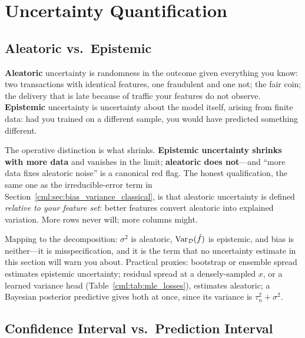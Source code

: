 \section{Uncertainty Quantification}
\label{cml:sec:uncertainty}

\subsection{Aleatoric vs.\ Epistemic}

\textbf{Aleatoric} uncertainty is randomness in the outcome given everything you know: two transactions with identical features, one fraudulent and one not; the fair coin; the delivery that is late because of traffic your features do not observe. \textbf{Epistemic} uncertainty is uncertainty about the model itself, arising from finite data: had you trained on a different sample, you would have predicted something different.

The operative distinction is what shrinks. \textbf{Epistemic uncertainty shrinks with more data} and vanishes in the limit; \textbf{aleatoric does not}---and ``more data fixes aleatoric noise'' is a canonical red flag. The honest qualification, the same one as the irreducible-error term in Section~\ref{cml:sec:bias_variance_classical}, is that aleatoric uncertainty is defined \textit{relative to your feature set}: better features convert aleatoric into explained variation. More rows never will; more columns might.

Mapping to the decomposition: $\sigma^2$ is aleatoric, $\operatorname{Var}_\mathcal{D}(\hat f)$ is epistemic, and bias is neither---it is misspecification, and it is the term that no uncertainty estimate in this section will warn you about. Practical proxies: bootstrap or ensemble spread estimates epistemic uncertainty; residual spread at a densely-sampled $x$, or a learned variance head (Table~\ref{cml:tab:mle_losses}), estimates aleatoric; a Bayesian posterior predictive gives both at once, since its variance is $\tau_n^2 + \sigma^2$.

\subsection{Confidence Interval vs.\ Prediction Interval}

